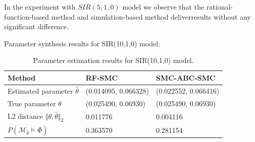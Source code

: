 In the experiment with $SIR(5,1,0)$ model we observe that the rational-function-based method and
simulation-based method deliverresults without any significant difference.

\newpage
\noindent
Parameter synthesis results for SIR(10,1,0) model:
\begin{table}[H]
    \begin{tabular}{|l|l|l|}
        \hline
        Method                                           & RF-SMC               & SMC-ABC-SMC          \\ \hline
        Estimated parameter $\hat{\theta}$               & (0.014095, 0.066328) & (0.022552, 0.066416) \\ \hline
        True parameter $\theta$                          & (0.025490, 0.06930)  & (0.025490, 0.06930)  \\ \hline
        L2 distance $\Vert \theta, \hat{\theta} \Vert_2$ & 0.011776             & 0.004116             \\ \hline
        $P(\mathcal{M}_{\hat{\theta}}\models\Phi)$       & 0.363570             & 0.281154             \\ \hline
    \end{tabular}
    \caption{Parameter estimation results for SIR(10,1,0) model.}
\end{table}

